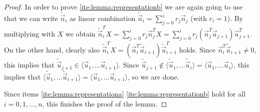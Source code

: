\documentclass[10pt,a4paper]{amsart}
\newcommand{\va}{\vec{a}}
\newcommand{\vn}{\vec{n}}
\newcommand{\vu}{\vec{u}}
\begin{document}
\begin{proof}
In order to prove \ref{ite:lemma:representationb} we are again going to use that we can write $\tilde \vn_i$ as linear combination $\tilde \vn_i = \sum_{j = 0}^{i} r_j \vn_j$ (with $r_i = 1$). By multiplying with $X$ we obtain $\tilde \vn_i^T X = \sum_{j=0}^i r_j \vn_j^T X = \sum_{j=0}^i r_j (\vn_j^T \va_{j+1})\vu_{j+1}^T$. On the other hand, clearly also $\tilde \vn_i^T X  = (\vn_i^T \tilde \va_{i+1}) \tilde \vu_{i+1}^T$ holds. Since $\vn_i^T \tilde \va_{i+1} \neq 0$, this implies that $\tilde \vu_{j+1} \in \langle \vu_{1}, \ldots \vu_{i+1}\rangle$. Since $\tilde \vu_{j+1} \notin \langle \tilde \vu_{1}, \ldots \tilde \vu_{i}\rangle = \langle \vu_{1}, \ldots \vu_{i}\rangle$, this implies that $\langle \tilde \vu_{1}, \ldots \tilde \vu_{i+1}\rangle = \langle \vu_{1}, \ldots \vu_{i+1}\rangle$, so we are done.

Since items \ref{ite:lemma:representationa} \ref{ite:lemma:representationb} hold for all $i=0,1,\ldots, n$, this finishes the proof of the lemma.
\end{proof}
\end{document}
